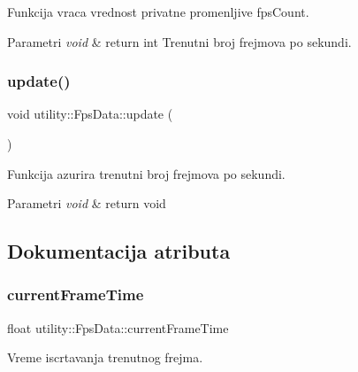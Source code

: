 Funkcija vraca vrednost privatne promenljive fps\+Count. 


\begin{DoxyParams}{Parametri}
{\em void} & return int Trenutni broj frejmova po sekundi. \\
\hline
\end{DoxyParams}
\mbox{\label{classutility_1_1FpsData_adcc115a219b00aa4d0c979955b617f91}} 
\subsubsection{\texorpdfstring{update()}{update()}}
{\footnotesize\ttfamily void utility\+::\+Fps\+Data\+::update (\begin{DoxyParamCaption}{ }\end{DoxyParamCaption})}



Funkcija azurira trenutni broj frejmova po sekundi. 


\begin{DoxyParams}{Parametri}
{\em void} & return void \\
\hline
\end{DoxyParams}


\subsection{Dokumentacija atributa}
\mbox{\label{classutility_1_1FpsData_a8d446a1d25857ec240d8fe91a8db0e47}} 
\subsubsection{\texorpdfstring{current\+Frame\+Time}{currentFrameTime}}
{\footnotesize\ttfamily float utility\+::\+Fps\+Data\+::current\+Frame\+Time\hspace{0.3cm}{\ttfamily [private]}}



Vreme iscrtavanja trenutnog frejma. 

\mbox{\label{classutility_1_1FpsData_a72384b61915ece78bad19d36cfc0de41}} 
